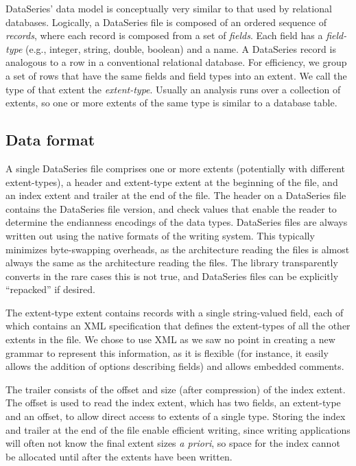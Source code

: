 \documentclass{acm_proc_article-sp}
\begin{document}
DataSeries' data model is conceptually very similar to that used by
relational databases.  Logically, a DataSeries file is composed of an
ordered sequence of {\it records}, where each record is composed from
a set of {\it fields}. Each field has a {\it field-type} (e.g.,
integer, string, double, boolean) and a name. A DataSeries record is
analogous to a row in a conventional relational database. For
efficiency, we group a set of rows that have the same fields and field
types into an extent.  We call the type of that extent the {\it
extent-type}.  Usually an analysis 
runs over a collection of
extents, so one or more extents of the same type is similar to a
database table.

\subsection{Data format}

A single DataSeries file comprises one or more extents
(potentially with different extent-types), a header and
extent-type extent at the beginning of the file, and an index extent
and trailer at the end of the file. The header on a DataSeries file 
contains the DataSeries
file version, and check values that enable the reader to determine the
endianness encodings of the data types.  DataSeries files are always
written out using the native formats of the writing system. This 
typically minimizes byte-swapping overheads, as the architecture 
reading the files is almost always the same as the architecture reading
the files. The library transparently converts in the rare cases this
is not true, and DataSeries files can be explicitly ``repacked'' if desired. 

The extent-type extent contains records with a single string-valued
field, each of which contains an XML specification that defines the
extent-types of all the other extents in the file. We chose to use XML
as we saw no point in creating a new
grammar 
to represent this information, as it is flexible (for
instance, it easily allows the addition of options describing
fields) and allows embedded comments.

The trailer
consists of the offset and size (after compression) of the index
extent.  The offset is used to read the index extent, which has two
fields, an extent-type and an offset, to allow direct access to
extents of a single type. Storing the index and trailer at the end
of the file enable efficient writing, since writing applications will
often not know
the final extent sizes \textit{a priori},
so space 
for the index cannot be allocated until after the extents have been written.
\end{document}
